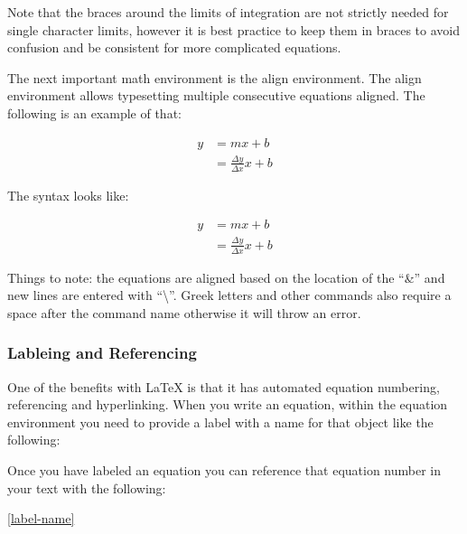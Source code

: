 Note that the braces around the limits of integration are not strictly needed for single character limits, however it is best practice to keep them in braces to avoid confusion and be consistent for more complicated equations.

The next important math environment is the align environment. The align environment allows typesetting multiple consecutive equations aligned. The following is an example of that:

\begin{align}
y &= mx + b\\ 
  &= \frac{\Delta y}{\Delta x}x + b
\end{align}

The syntax looks like:

\begin{center}
\begin{latexcode}
\begin{align}
y &= mx + b\\ 
  &= \frac{\Delta y}{\Delta x}x + b
\end{align}
\end{latexcode}
\end{center}

Things to note: the equations are aligned based on the location of the ``\&'' and new lines are entered with ``\textbackslash''. Greek letters and other commands also require a space after the command name otherwise it will throw an error.

\subsubsection{Lableing and Referencing}
One of the benefits with \LaTeX{} is that it has automated equation numbering, referencing and hyperlinking. When you write an equation, within the equation environment you need to provide a label with a name for that object like the following:

\begin{center}
\begin{latexcode}
\label{label-name}
\end{latexcode}
\end{center}

Once you have labeled an equation you can reference that equation number in your text with the following:

\begin{center}
\begin{latexcode}
\ref{label-name}
\end{latexcode}
\end{center}

